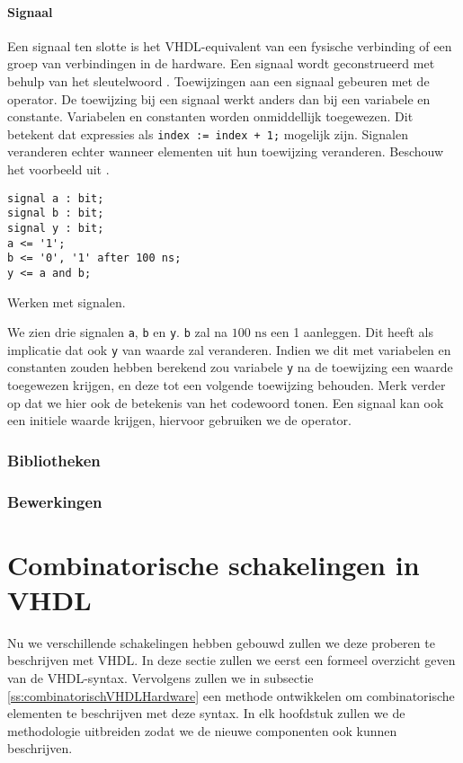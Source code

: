 \paragraph{Signaal}Een signaal ten slotte is het VHDL-equivalent van een fysische verbinding of een groep van verbindingen in de hardware. Een signaal wordt geconstrueerd met behulp van het sleutelwoord . Toewijzingen aan een signaal gebeuren met de \vhdltermen{<=} operator. De toewijzing bij een signaal werkt anders dan bij een variabele en constante. Variabelen en constanten worden onmiddellijk toegewezen. Dit betekent dat expressies als \verb/index := index + 1;/ mogelijk zijn. Signalen veranderen echter wanneer elementen uit hun toewijzing veranderen. Beschouw het voorbeeld uit .
\begin{vhdlcode}[hbt]
\begin{lstlisting}
signal a : bit;
signal b : bit;
signal y : bit;
a <= '1';
b <= '0', '1' after 100 ns;
y <= a and b;
\end{lstlisting}
\caption{Werken met signalen.}
\label{lst:variabele}
\end{vhdlcode}
We zien drie signalen \verb+a+, \verb+b+ en \verb+y+. \verb+b+ zal na $100\mbox{ ns}$ een 1 aanleggen. Dit heeft als implicatie dat ook \verb+y+ van waarde zal veranderen. Indien we dit met variabelen en constanten zouden hebben berekend zou variabele \verb+y+ na de toewijzing een waarde toegewezen krijgen, en deze tot een volgende toewijzing behouden. Merk verder op dat we hier ook de betekenis van het codewoord  tonen. Een signaal kan ook een initiele waarde krijgen, hiervoor gebruiken we de \vhdltermen{:=} operator.
\subsubsection{Bibliotheken}
\subsubsection{Bewerkingen}
\section{Combinatorische schakelingen in VHDL}
\label{s:combinatorischVHDL}
Nu we verschillende schakelingen hebben gebouwd zullen we deze proberen te beschrijven met VHDL. In deze sectie zullen we eerst een formeel overzicht geven van de VHDL-syntax. Vervolgens zullen we in subsectie \ref{ss:combinatorischVHDLHardware} een methode ontwikkelen om combinatorische elementen te beschrijven met deze syntax. In elk hoofdstuk zullen we de methodologie uitbreiden zodat we de nieuwe componenten ook kunnen beschrijven.
